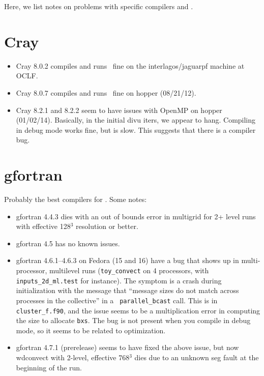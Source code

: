 Here, we list notes on problems with specific compilers and \maestro.


\section{Cray}

\begin{itemize}
\item Cray 8.0.2 compiles and runs \maestro\ fine on the interlagos/jaguarpf 
machine at OCLF.
\item Cray 8.0.7 compiles and runs \maestro\ fine on hopper (08/21/12).
\item Cray 8.2.1 and 8.2.2 seem to have issues with OpenMP on hopper (01/02/14).  Basically, in the initial divu iters, we appear to hang.  Compiling in debug mode works fine, but is slow.  This suggests that there is a compiler bug.
\end{itemize}


\section{gfortran}

Probably the best compilers for \maestro.  
Some notes:
\begin{itemize}
\item gfortran 4.4.3 dies with an out of bounds error in multigrid for
2+ level runs with effective 128$^3$ resolution or better.
\item gfortran 4.5 has no known issues.
\item gfortran 4.6.1--4.6.3 on Fedora (15 and 16) have a bug that 
shows up in multi-processor, multilevel runs ({\tt toy\_convect} on 4
processors, with {\tt inputs\_2d\_ml.test} for instance).  The symptom
is a crash during initialization with the message that ``message sizes
do not match across processes in the collective'' in a {\tt
parallel\_bcast} call.  This is in {\tt cluster\_f.f90}, and the issue
seems to be a multiplication error in computing the size to allocate
{\tt bxs}.  The bug is not present when you compile in debug mode, so
it seems to be related to optimization.
\item gfortran 4.7.1 (prerelease) seems to have fixed the above issue,
but now wdconvect with 2-level, effective 768$^3$ dies due to an
unknown seg fault at the beginning of the run.
\end{itemize}

